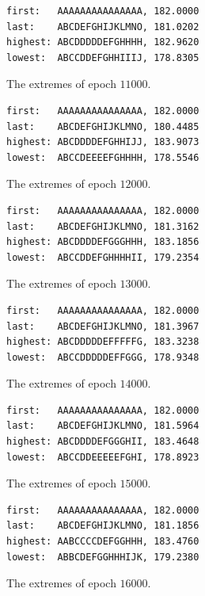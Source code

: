 \documentclass[a4paper, 10pt, notitlepage, twocolumn]{article}
\begin{document}
\begin{figure}[!ht]
 \begin{verbatim}
first:   AAAAAAAAAAAAAAA, 182.0000
last:    ABCDEFGHIJKLMNO, 181.0202
highest: ABCDDDDDEFGHHHH, 182.9620
lowest:  ABCCDDEFGHHIIIJ, 178.8305
 \end{verbatim}
 \vspace{-20pt} 
 \caption{The extremes of epoch $11000$.}
\end{figure}


\begin{figure}[!ht]
 \begin{verbatim}
first:   AAAAAAAAAAAAAAA, 182.0000
last:    ABCDEFGHIJKLMNO, 180.4485
highest: ABCDDDDEFGHHIJJ, 183.9073
lowest:  ABCCDEEEEFGHHHH, 178.5546

 \end{verbatim}
 \vspace{-20pt} 
 \caption{The extremes of epoch $12000$.}
\end{figure}


\begin{figure}[!ht]
 \begin{verbatim}
first:   AAAAAAAAAAAAAAA, 182.0000
last:    ABCDEFGHIJKLMNO, 181.3162
highest: ABCDDDDEFGGGHHH, 183.1856
lowest:  ABCCDDEFGHHHHII, 179.2354
 \end{verbatim}
 \vspace{-20pt} 
 \caption{The extremes of epoch $13000$.}
\end{figure}

\begin{figure}[!ht]
 \begin{verbatim}
first:   AAAAAAAAAAAAAAA, 182.0000
last:    ABCDEFGHIJKLMNO, 181.3967
highest: ABCDDDDDEFFFFFG, 183.3238
lowest:  ABCCDDDDDEFFGGG, 178.9348
 \end{verbatim}
 \vspace{-20pt} 
 \caption{The extremes of epoch $14000$.}
\end{figure}


\begin{figure}[!ht]
 \begin{verbatim}
first:   AAAAAAAAAAAAAAA, 182.0000
last:    ABCDEFGHIJKLMNO, 181.5964
highest: ABCDDDDEFGGGHII, 183.4648
lowest:  ABCCDDEEEEEFGHI, 178.8923
 \end{verbatim}
 \vspace{-20pt} 
 \caption{The extremes of epoch $15000$.}
\end{figure}


\begin{figure}[!ht]
 \begin{verbatim}
first:   AAAAAAAAAAAAAAA, 182.0000
last:    ABCDEFGHIJKLMNO, 181.1856
highest: AABCCCCDEFGGHHH, 183.4760
lowest:  ABBCDEFGGHHHIJK, 179.2380
 \end{verbatim}
 \vspace{-20pt} 
 \caption{The extremes of epoch $16000$.}
\end{figure}
\end{document}
